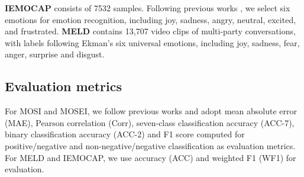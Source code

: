 \documentclass[11pt]{article}
\begin{document}
\textbf{IEMOCAP} consists of 7532 samples. Following previous works  \cite{DBLP:conf/aaai/WangSLLZM19,DBLP:conf/icassp/HuHWJM22}, we select six emotions for emotion recognition, including joy, sadness, angry, neutral, excited, and frustrated. \textbf{MELD} contains 13,707 video clips of multi-party conversations, with labels following Ekman’s six universal emotions, including joy, sadness, fear, anger, surprise and disgust.



\subsection{Evaluation metrics}
For MOSI and MOSEI, we follow previous works \cite{DBLP:conf/emnlp/HanCP21} and adopt mean absolute error (MAE), Pearson correlation (Corr), seven-class classification accuracy (ACC-7), binary classification accuracy (ACC-2) and F1 score computed for positive/negative and non-negative/negative classification as evaluation metrics. For MELD and IEMOCAP, we use accuracy (ACC) and weighted F1 (WF1) for evaluation.


\begin{table}[]
\centering
{}
\caption{The details of MOSI, MOSEI, MELD, and IEMOCAP, including data splitting and the labels it contains, where Senti. and Emo. represent the label sentiment polarity and intensity of MSA and emotion category of ERC, respectively. \Checkmark and \XSolidBrush denote the dataset has or does not have the label.}
\label{tab:data}
\end{table}
\end{document}
